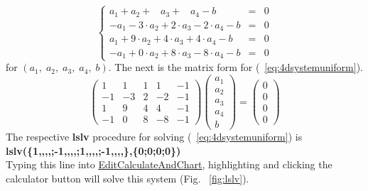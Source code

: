 \documentclass[color=black,11pt]{elegantpaper}
\begin{document}
\begin{example}
\begin{equation}
\label{eq:4dsystemuniform}
\left\{ \begin{array}{ccc}
        a_1 + a_2+\;\;\; a_3+\;\;\; a_4-b&=&0 \\
        -a_1 -3\cdot a_2+2\cdot a_3- 2\cdot a_4-b&=&0 \\
        a_1 +9\cdot a_2+4\cdot a_3+4 \cdot a_4-b&=&0 \\
        -a_1 +0\cdot a_2+8\cdot a_3-8\cdot a_4-b&=&0 
       \end{array} \right.
\end{equation}
for $(a_1,\; a_2,\; a_3,\; a_4,\; b).$ The next is the matrix form for (~\ref{eq:4dsystemuniform}).
$$
\left(\begin{array}{ccccc}
         1&1&1&1&-1\\
         -1&-3&2&-2&-1\\
         1&9&4&4&-1\\
         -1&0&8&-8&-1
      \end{array}\right)\left(\begin{array}{c}
                                  a_1\\
                                  a_2\\
                                  a_3\\
                                  a_4\\
                                  b
                              \end{array}\right)= \left(\begin{array}{c}
                                                           0\\
                                                           0\\
                                                           0\\
                                                           0
                                                         \end{array}\right) 
$$
The respective {\bf lslv} procedure for solving (~\ref{eq:4dsystemuniform}) is \\
{\bf lslv(\{1,,,,;-1,,,,;1,,,,;-1,,,,\},\;\{0;0;0;0\}) } \\
Typing this line into  \href{https://github.com/mathhobbit/EditCalculateAndChart/releases}{EditCalculateAndChart}, highlighting and clicking the calculator button will solve this system (Fig. ~\ref{fig:lslv}).

\end{example}
\end{document}
